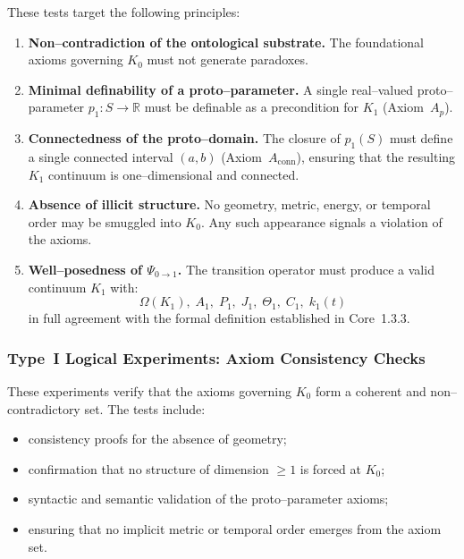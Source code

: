 These tests target the following principles:

\begin{enumerate}
    \item \textbf{Non–contradiction of the ontological substrate.}
          The foundational axioms governing $K_0$ must not generate paradoxes.

    \item \textbf{Minimal definability of a proto–parameter.}
          A single real–valued proto–parameter $p_1: S\to\mathbb{R}$ must be
          definable as a precondition for $K_1$ (Axiom~$A_p$).

    \item \textbf{Connectedness of the proto–domain.}
          The closure of $p_1(S)$ must define a single connected interval
          $(a,b)$ (Axiom~$A_{\mathrm{conn}}$), ensuring that the resulting
          $K_1$ continuum is one–dimensional and connected.

    \item \textbf{Absence of illicit structure.}
          No geometry, metric, energy, or temporal order may be smuggled into
          $K_0$.
          Any such appearance signals a violation of the axioms.

    \item \textbf{Well–posedness of $\Psi_{0\to 1}$.}
          The transition operator must produce a valid continuum $K_1$ with:
          \[
             \Omega(K_1),\; A_1,\; P_1,\; J_1,\; \Theta_1,\; C_1,\; k_1(t)
          \]
          in full agreement with the formal definition established in
          Core~1.3.3.
\end{enumerate}


\subsubsection{Type~I Logical Experiments: Axiom Consistency Checks}

These experiments verify that the axioms governing $K_0$ form a coherent
and non–contradictory set.
The tests include:

\begin{itemize}
    \item consistency proofs for the absence of geometry;
    \item confirmation that no structure of dimension $\ge 1$ is forced at $K_0$;
    \item syntactic and semantic validation of the proto–parameter axioms;
    \item ensuring that no implicit metric or temporal order emerges from
          the axiom set.
\end{itemize}

